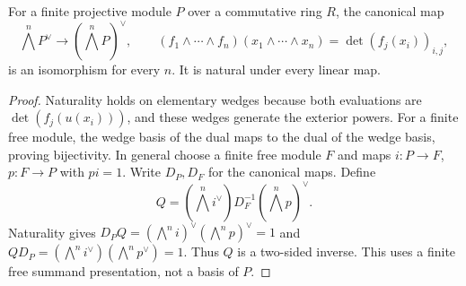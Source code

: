 \begin{lemma}
\label{lem:projective-exterior-duality}
\leanok
For a finite projective module $P$ over a commutative ring $R$, the canonical
map
\[
 \bigwedge^n P^\vee\longrightarrow(\bigwedge^n P)^\vee,
 \qquad (f_1\wedge\cdots\wedge f_n)(x_1\wedge\cdots\wedge x_n)
       =\det(f_j(x_i))_{i,j},
\]
is an isomorphism for every $n$. It is natural under every linear map.
\end{lemma}
\begin{proof}
Naturality holds on elementary wedges because both evaluations are
$\det(f_j(u(x_i)))$, and these wedges generate the exterior powers.
For a finite free module, the wedge basis of the dual maps to the dual of
the wedge basis, proving bijectivity. In general choose a finite free module
$F$ and maps $i:P\to F$, $p:F\to P$ with $pi=1$. Write $D_P,D_F$ for
the canonical maps. Define
\[
 Q=(\bigwedge^n i^\vee)D_F^{-1}(\bigwedge^n p)^\vee.
\]
Naturality gives $D_P Q=(\bigwedge^n i)^\vee(\bigwedge^n p)^\vee=1$
and $Q D_P=(\bigwedge^n i^\vee)(\bigwedge^n p^\vee)=1$.
Thus $Q$ is a two-sided inverse. This uses a finite free summand presentation,
not a basis of $P$.
\end{proof}

